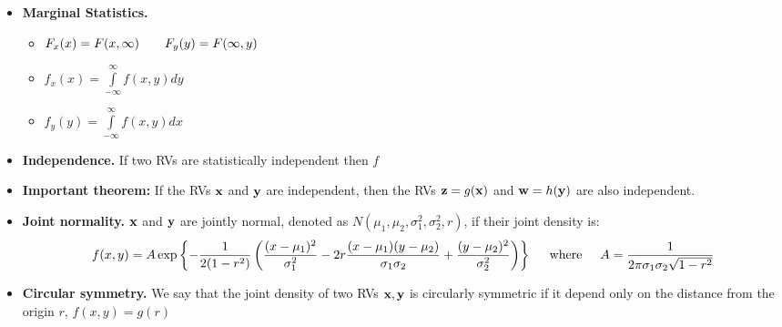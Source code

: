 \documentclass[a4paper, oneside]{book}
\begin{document}
\begin{itemize}
\item \textbf{Marginal Statistics.}
	\begin{itemize}
	\item $F_x(x) = F(x,\infty) \hspace{0.7truecm} F_y(y) = F(\infty, y)$
	\item $f_x(x) = \int\limits_{-\infty}^{\infty} f(x,y) dy$
	\item $f_y(y) = \int\limits_{-\infty}^{\infty} f(x,y) dx$
	\end{itemize}
\item \textbf{Independence.} If two RVs are statistically independent then $f$
\item \textbf{Important theorem:} If the RVs $\mathbf x$ and $\mathbf y$ are independent, then the RVs $\mathbf z = g(\mathbf x)$ and $\mathbf w = h(\mathbf y)$ are also independent. 
\item \textbf{Joint normality. } $\mathbf x$ and $\mathbf y$ are jointly normal, denoted as $N(\mu_1, \mu_2, \sigma_1^2, \sigma_2^2, r)$,  if their joint density is:
$$f(x,y) =  A \exp\left\{ -\frac{1}{2(1-r^2)} \left( \frac{(x-\mu_1)^2}{\sigma_1^2} -2 r\frac{(x-\mu_1)(y-\mu_2)}{\sigma_1 \sigma_2} + \frac{(y-\mu_2)^2}{\sigma_2^2}  \right)  \right\}\hspace{0.5cm}\text{where}\hspace{0.5cm}A= \frac{1}{2\pi \sigma_1 \sigma_2 \sqrt{1-r^2}}$$
\item \textbf{Circular symmetry. } We say that the joint density of two RVs $\mathbf{x,y}$ is circularly symmetric if it depend only on the distance from the origin $r$, \ie $f(x,y) = g(r)$
\end{itemize}
\end{document}
